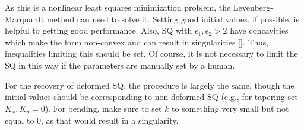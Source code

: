 As this is a nonlinear least squares minimization problem, the Levenberg-Marquardt method can used to solve it. Setting good initial values, if possible, is helpful to getting good performance. Also, \gls{SQ} with $\epsilon_1,\epsilon_2>2$ have concavities which make the form non-convex and can result in singularities [\citeauthor{Jaklic2000}]. Thus, inequalities limiting this should be set. Of course, it is not necessary to limit the \gls{SQ} in this way if the parameters are manually set by a human.

For the recovery of deformed \gls{SQ}, the procedure is largely the same, though the initial values should be corresponding to non-deformed \gls{SQ} (e.g., for tapering set $K_x,K_y = 0$). For bending, make sure to set $k$ to something very small but not equal to $0$, as that would result in a singularity.

